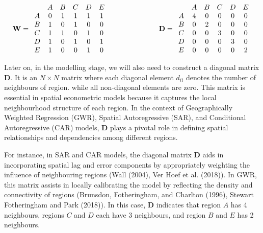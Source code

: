 \documentclass[
  default,
]{sn-jnl}
\begin{document}
\[
\mathbf{W} =
\begin{array}{cccccc}
   & A & B & C & D & E \\
A & 0 & 1 & 1 & 1 & 1\\ 
B & 1 & 0 & 1 & 0 & 0\\ 
C & 1 & 1 & 0 & 1 & 0\\
D & 1 & 0 & 1 & 0 & 1\\
E & 1 & 0 & 0 & 1 & 0\\
\end{array}
\hspace{2.5cm}
\mathbf{D} =
\begin{array}{cccccc}
   & A & B & C & D & E \\
A & 4 & 0 & 0 & 0 & 0\\ 
B & 0 & 2 & 0 & 0 & 0\\ 
C & 0 & 0 & 3 & 0 & 0\\
D & 0 & 0 & 0 & 3 & 0\\
E & 0 & 0 & 0 & 0 & 2\\
\end{array}
\]

Later on, in the modelling stage, we will also need to construct a
diagonal matrix \(\boldsymbol{D}\). It is an \(N \times N\) matrix where
each diagonal element \(d_{ii}\) denotes the number of neighbours of
region. while all non-diagonal elements are zero. This matrix is
essential in spatial econometric models because it captures the local
neighbourhood structure of each region. In the context of Geographically
Weighted Regression (GWR), Spatial Autoregressive (SAR), and Conditional
Autoregressive (CAR) models, \(\boldsymbol{D}\) plays a pivotal role in
defining spatial relationships and dependencies among different regions.

For instance, in SAR and CAR models, the diagonal matrix
\(\boldsymbol{D}\) aids in incorporating spatial lag and error
components by appropriately weighting the influence of neighbouring
regions (Wall (2004), Ver Hoef et al. (2018)). In GWR, this matrix
assists in locally calibrating the model by reflecting the density and
connectivity of regions (Brunsdon, Fotheringham, and Charlton (1996),
Stewart Fotheringham and Park (2018)). In this case, \(\mathbf{D}\)
indicates that region \(A\) has 4 neighbours, regions \(C\) and \(D\)
each have 3 neighbours, and region \(B\) and \(E\) has 2 neighbours.
\end{document}
